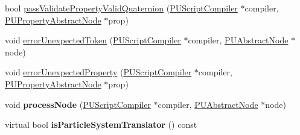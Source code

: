 \begin{DoxyCompactItemize}
\item 
bool \hyperlink{classPUScriptTranslator_a94972ffef7d58c1537e3868d50c89dbf}{pass\+Validate\+Property\+Valid\+Quaternion} (\hyperlink{classPUScriptCompiler}{P\+U\+Script\+Compiler} $\ast$compiler, \hyperlink{classPUPropertyAbstractNode}{P\+U\+Property\+Abstract\+Node} $\ast$prop)
\item 
void \hyperlink{classPUScriptTranslator_ad17bf5fd56218fc667642122a100ba3e}{error\+Unexpected\+Token} (\hyperlink{classPUScriptCompiler}{P\+U\+Script\+Compiler} $\ast$compiler, \hyperlink{classPUAbstractNode}{P\+U\+Abstract\+Node} $\ast$node)
\item 
void \hyperlink{classPUScriptTranslator_a9752b9ee3231292a617cffe543515da9}{error\+Unexpected\+Property} (\hyperlink{classPUScriptCompiler}{P\+U\+Script\+Compiler} $\ast$compiler, \hyperlink{classPUPropertyAbstractNode}{P\+U\+Property\+Abstract\+Node} $\ast$prop)
\item 
\mbox{\label{classPUScriptTranslator_a22dee1a468d9cc1aaf6c1d69fcfc2caa}} 
void {\bfseries process\+Node} (\hyperlink{classPUScriptCompiler}{P\+U\+Script\+Compiler} $\ast$compiler, \hyperlink{classPUAbstractNode}{P\+U\+Abstract\+Node} $\ast$node)
\item 
\mbox{\label{classPUScriptTranslator_ac5bfa201e8de2286587a3c1748bec3c7}} 
virtual bool {\bfseries is\+Particle\+System\+Translator} () const
\end{DoxyCompactItemize}
